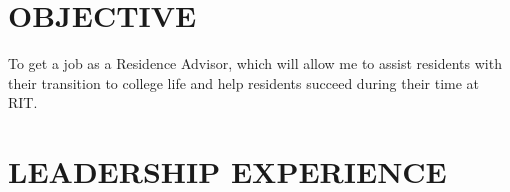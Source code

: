 \documentclass[line,margin]{res}
\begin{document}
\setlength\columnsep{-30pt}
\address{blank}
\address{blank}
\website{}
 
\begin{resume}
 \setlength
 \multicolsep{2pt}

\section{OBJECTIVE} %
	To get a job as a Residence Advisor, which will allow me to assist residents with their transition to college life and help residents succeed during their time at RIT.
 
\section{LEADERSHIP EXPERIENCE} %


\end{resume}
\end{document}
